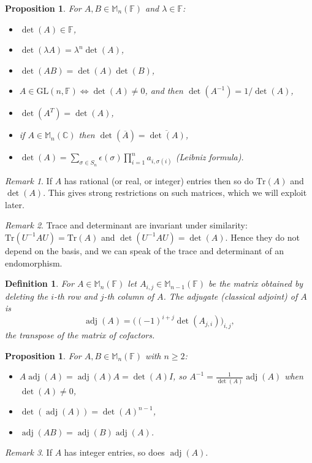 \documentclass[12pt]{article}
\renewcommand{\Tr}{\mathrm{Tr}}
\DeclareMathOperator{\adj}{adj}
\theoremstyle{breakplain}
\newtheorem{prop}[theorem]{Proposition}
\theoremstyle{breakdef}
\newtheorem{definition}[theorem]{Definition}
\theoremstyle{remark}
\newtheorem*{remark}{Remark}
\begin{document}
\begin{prop}
    For $A,B \in \mathbb{M}_{n}(\mathbb{F})$ and $\lambda\in\mathbb{F}$:
    \begin{itemize}
        \item $\det(A)\in \mathbb{F}$,
        \item $\det(\lambda A)=\lambda^n \det(A)$,
        \item $\det(AB)=\det(A)\det(B)$,
        \item $A \in \mathrm{GL}(n,\mathbb{F}) \iff \det(A)\neq 0$, and then $\det(A^{-1})={1}/{\det(A)}$,
        \item $\det(A^{T})=\det(A)$,
        \item if $A\in \mathbb{M}_{n}(\mathbb{C})$ then $\det(\overline{A})=\overline{\det(A)}$,
        \item $\det(A)=\sum_{\sigma \in S_n}\epsilon(\sigma)\prod_{i=1}^n a_{i,\sigma(i)}$ \textup{(Leibniz formula)}.
    \end{itemize}
\end{prop}
\begin{remark}
    If $A$ has rational (or real, or integer) entries then so do $\Tr(A)$ and $\det(A)$. This gives strong restrictions on such matrices, which we will exploit later.
\end{remark}
\begin{remark}
    Trace and determinant are invariant under similarity: $\Tr(U^{-1}AU)=\Tr(A)$ and $\det(U^{-1}AU)=\det(A)$. Hence they do not depend on the basis, and we can speak of the trace and determinant of an endomorphism.
\end{remark}
\begin{definition}
    For $A\in \mathbb{M}_n(\mathbb{F})$ let $A_{i,j}\in\mathbb{M}_{n-1}(\mathbb{F})$ be the matrix obtained by deleting the $i$-th row and $j$-th column of $A$. The \emph{adjugate} (classical adjoint) of $A$ is
    \[\adj(A)=\big((-1)^{i+j}\det(A_{j,i})\big)_{i,j},\]
    the transpose of the matrix of cofactors.
\end{definition}
\begin{prop}
    For $A,B\in \mathbb{M}_n(\mathbb{F})$ with $n\geq 2$:
    \begin{itemize}
        \item $A\adj(A)=\adj(A)A=\det(A)I$, so $A^{-1} = \frac{1}{\det(A)}\adj(A)$ when $\det(A)\neq 0$,
        \item $\det(\adj(A))=\det(A)^{n-1}$,
        \item $\adj(AB)=\adj(B)\adj(A)$.
    \end{itemize}
\end{prop}
\begin{remark}
    If $A$ has integer entries, so does $\adj(A)$.
\end{remark}
\end{document}
